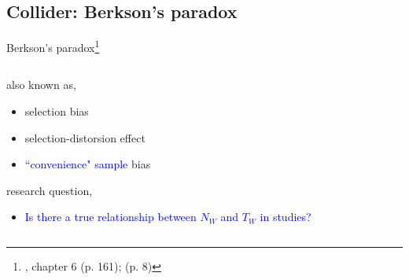 %
%
\subsection{Collider: Berkson's paradox}
%
%
\begin{frame}[t, negative, label=sa]
	\subsectionpage
\end{frame}
%
%
\begin{frame}
	{Berkson's paradox\footnote{\citet{McElreath_2020}, chapter 6 (p. 161); \citet{Cinelli_et_al_2021} (p. 8)}}
	\begin{columns}
		\begin{column}{0.5\textwidth}
			also known as,
			\begin{itemize}
				\item selection bias
				\item selection-distorsion effect
				\item \textcolor{blue}{``convenience" sample} bias
			\end{itemize}
			
			research question, 
			\begin{itemize}
				\item \textcolor{blue}{Is there a true relationship between $N_{W}$ and $T_{W}$ in studies?}
			\end{itemize}
			

\end{column}
\end{columns}
\end{frame}
